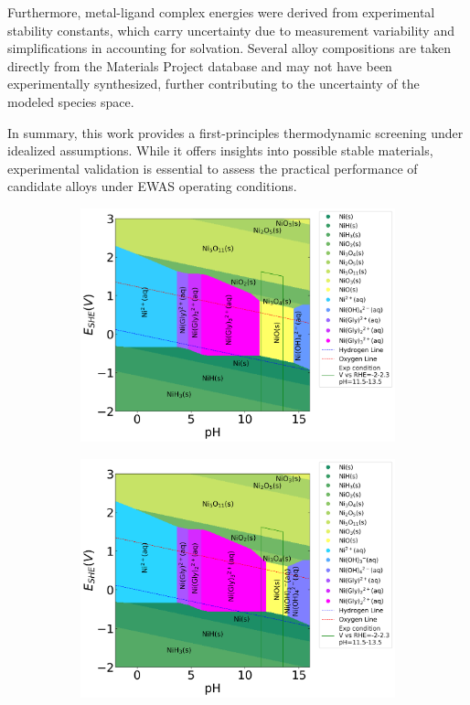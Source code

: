 \documentclass[journal=jacsat,manuscript=article]{achemso}
\begin{document}
Furthermore, metal-ligand complex energies were derived from experimental stability constants, which carry uncertainty due to measurement variability and simplifications in accounting for solvation. Several alloy compositions are taken directly from the Materials Project database and may not have been experimentally synthesized, further contributing to the uncertainty of the modeled species space.

In summary, this work provides a first-principles thermodynamic screening under idealized assumptions. While it offers insights into possible stable materials, experimental validation is essential to assess the practical performance of candidate alloys under EWAS operating conditions.


\begin{figure}[htbp]
    \centering
    \begin{subfigure}[b]{0.45\textwidth}
        \subcaption{}\label{fig:Ni_noise_-0.2}
        \includegraphics[width=\textwidth]{Figures/pourbaix_diagrams/Ni_gly_-0.2.png}
    \end{subfigure}
    \begin{subfigure}[b]{0.45\textwidth}
        \subcaption{}\label{fig:Ni_noise_-0.067}
        \includegraphics[width=\textwidth]{Figures/pourbaix_diagrams/Ni_gly_-0.06666666666666668.png} 

\end{subfigure}
\end{figure}
\end{document}
